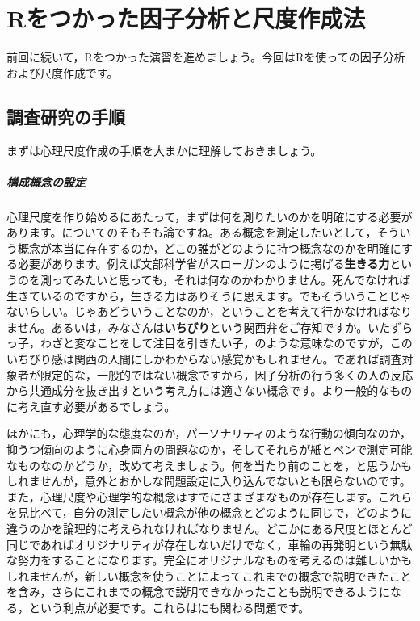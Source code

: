 \documentclass{ltjsbook}
\begin{document}
 
\chapter{Rをつかった因子分析と尺度作成法} 
\label{chapter10} 
前回に続いて，Rをつかった演習を進めましょう。今回はRを使っての因子分析および尺度作成です。

\section{調査研究の手順}
まずは心理尺度作成の手順を大まかに理解しておきましょう。

\paragraph{構成概念の設定}心理尺度を作り始めるにあたって，まずは何を測りたいのかを明確にする必要があります。についてのそもそも論ですね。ある概念を測定したいとして，そういう概念が本当に存在するのか，どこの誰がどのように持つ概念なのかを明確にする必要があります。例えば文部科学省がスローガンのように掲げる\textbf{生きる力}というのを測ってみたいと思っても，それは何なのかわかりません。死んでなければ生きているのですから，生きる力はありそうに思えます。でもそういうことじゃないらしい。じゃあどういうことなのか，ということを考えて行かなければなりません。あるいは，みなさんは\textbf{いちびり}という関西弁をご存知ですか。いたずらっ子，わざと変なことをして注目を引きたい子，のような意味なのですが，このいちびり感は関西の人間にしかわからない感覚かもしれません。であれば調査対象者が限定的な，一般的ではない概念ですから，因子分析の行う多くの人の反応から共通成分を抜き出すという考え方には適さない概念です。より一般的なものに考え直す必要があるでしょう。

ほかにも，心理学的な態度なのか，パーソナリティのような行動の傾向なのか，抑うつ傾向のように心身両方の問題なのか，そしてそれらが紙とペンで測定可能なものなのかどうか，改めて考えましょう。何を当たり前のことを，と思うかもしれませんが，意外とおかしな問題設定に入り込んでないとも限らないのです。また，心理尺度や心理学的な概念はすでにさまざまなものが存在します。これらを見比べて，自分の測定したい概念が他の概念とどのように同じで，どのように違うのかを論理的に考えられなければなりません。どこかにある尺度とほとんど同じであればオリジナリティが存在しないだけでなく，車輪の再発明という無駄な努力をすることになります。完全にオリジナルなものを考えるのは難しいかもしれませんが，新しい概念を使うことによってこれまでの概念で説明できたことを含み，さらにこれまでの概念で説明できなかったことも説明できるようになる，という利点が必要です。これらはにも関わる問題です。
\end{document}

